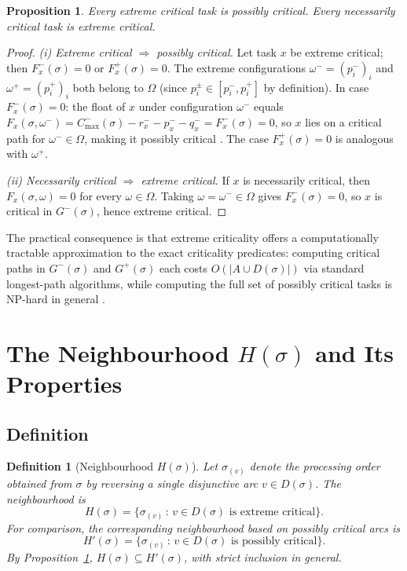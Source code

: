 \documentclass[preprint,12pt]{elsarticle}
\newtheorem{proposition}{Proposition}
\newtheorem{definition}{Definition}
\begin{document}
\begin{proposition}
\label{prop1}
Every extreme critical task is possibly critical. Every necessarily critical task is extreme critical.
\end{proposition}

\begin{proof}
\textit{(i) Extreme critical $\Rightarrow$ possibly critical.}
Let task $x$ be extreme critical; then $F_x^-(\sigma)=0$ or $F_x^+(\sigma)=0$.
The extreme configurations $\omega^- = (p_i^-)_{i}$ and $\omega^+ = (p_i^+)_{i}$ both belong to $\Omega$
(since $p_i^{\pm}\in[p_i^-,p_i^+]$ by definition).
In case $F_x^-(\sigma)=0$: the float of $x$ under configuration $\omega^-$ equals
$F_x(\sigma,\omega^-)=C^-_{\max}(\sigma)-r_x^- - p_x^- - q_x^- = F_x^-(\sigma)=0$,
so $x$ lies on a critical path for $\omega^-\in\Omega$, making it possibly critical \cite{Fortin2010,Artigues2015}.
The case $F_x^+(\sigma)=0$ is analogous with $\omega^+$.

\textit{(ii) Necessarily critical $\Rightarrow$ extreme critical.}
If $x$ is necessarily critical, then $F_x(\sigma,\omega)=0$ for every $\omega\in\Omega$.
Taking $\omega=\omega^-\in\Omega$ gives $F_x^-(\sigma)=0$, so $x$ is critical in $G^-(\sigma)$, hence extreme critical.
\end{proof}

\medskip

The practical consequence is that extreme criticality offers a computationally tractable approximation to the exact criticality predicates: computing critical paths in $G^-(\sigma)$ and $G^+(\sigma)$ each costs $O(|A \cup D(\sigma)|)$ via standard longest-path algorithms, while computing the full set of possibly critical tasks is NP-hard in general \cite{Fortin2010,Artigues2015}.


\section{The Neighbourhood $H(\sigma)$ and Its Properties}
\label{sec:H}

\subsection{Definition}
\label{sec:H-def}

\begin{definition}[Neighbourhood $H(\sigma)$]
\label{def2}
Let $\sigma_{(v)}$ denote the processing order obtained from $\sigma$ by reversing a single disjunctive arc $v \in D(\sigma)$. The neighbourhood is
\begin{equation}
H(\sigma) = \{ \sigma_{(v)} \,:\, v \in D(\sigma) \text{ is extreme critical}\}.
\end{equation}
For comparison, the corresponding neighbourhood based on \emph{possibly} critical arcs is
\begin{equation}
H'(\sigma) = \{ \sigma_{(v)} \,:\, v \in D(\sigma) \text{ is possibly critical}\}.
\end{equation}
By Proposition~\ref{prop1}, $H(\sigma) \subseteq H'(\sigma)$, with strict inclusion in general.
\end{definition}
\end{document}

